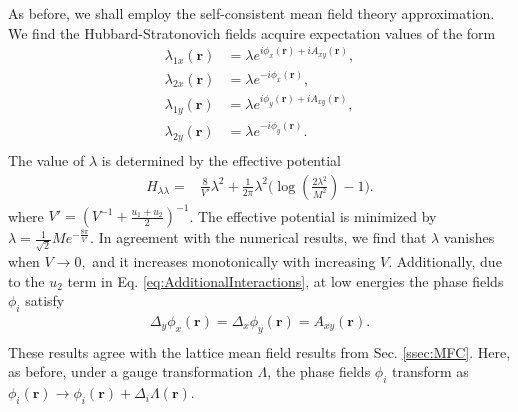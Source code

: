 \documentclass[prb,aps,twocolumn,groupaddress,floatfix]{revtex4-1}
\begin{document}
As before, we shall employ the self-consistent mean field theory approximation. We find the Hubbard-Stratonovich fields acquire expectation values of the form
\begin{equation}
\begin{split}
\lambda_{1x}(\bm{r}) &= \lambda e^{i\phi_x(\bm{r}) + iA_{xy}(\bm{r})},\\
\lambda_{2x}(\bm{r}) &= \lambda e^{-i\phi_x(\bm{r}) },\\
\lambda_{1y}(\bm{r}) &= \lambda e^{i\phi_y(\bm{r}) + iA_{xy}(\bm{r})},\\
\lambda_{2y}(\bm{r}) &= \lambda e^{-i\phi_y(\bm{r})}.\\
\end{split}\label{eq:ContSelfConsist}
\end{equation}
The value of $\lambda$ is determined by the effective potential
\begin{equation}
\begin{split}
H_{\lambda\lambda} = &\frac{8}{V'} \lambda^2 + \frac{1}{2\pi}\lambda^2\Big(\log(\frac{2\lambda^2}{M^2})-1\Big).
\end{split}
\end{equation} 
where $V' = (V^{-1} + \frac{u_1+u_2}{2} )^{-1}$. The effective potential is minimized by $\lambda = \frac{1}{\sqrt{2}} M e^{-\frac{8\pi}{V'}}$. In agreement with the numerical results, we find that $\lambda$ vanishes when $V \rightarrow 0,$ and it increases monotonically with increasing $V$. Additionally, due to the $u_2$ term in Eq. \ref{eq:AdditionalInteractions}, at low energies the phase fields $\phi_i$ satisfy
\begin{equation}
\begin{split}
 \Delta_y\phi_x(\bm{r})  =\Delta_x\phi_y(\bm{r}) = A_{xy}(\bm{r}).\\
\end{split}\label{eq:ContPhaseConstraint}
\end{equation}
These results agree with the lattice mean field results from Sec. \ref{ssec:MFC}. Here, as before, under a gauge transformation $\Lambda$, the phase fields $\phi_i$ transform as $\phi_i(\bm{r}) \rightarrow \phi_i(\bm{r}) + \Delta_i \Lambda(\bm{r})$. 
\end{document}
